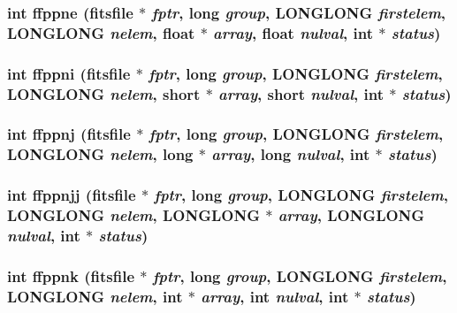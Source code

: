 \subsubsection{\setlength{\rightskip}{0pt plus 5cm}int ffppne (\bf{fitsfile} $\ast$ {\em fptr}, long {\em group}, \bf{LONGLONG} {\em firstelem}, \bf{LONGLONG} {\em nelem}, float $\ast$ {\em array}, float {\em nulval}, int $\ast$ {\em status})}\label{src_2fitsio_8h_01aa3f24254f8d3895463d830679fc52}


\subsubsection{\setlength{\rightskip}{0pt plus 5cm}int ffppni (\bf{fitsfile} $\ast$ {\em fptr}, long {\em group}, \bf{LONGLONG} {\em firstelem}, \bf{LONGLONG} {\em nelem}, short $\ast$ {\em array}, short {\em nulval}, int $\ast$ {\em status})}\label{src_2fitsio_8h_784592ce7e18c4280a1956b6f39cc70f}


\subsubsection{\setlength{\rightskip}{0pt plus 5cm}int ffppnj (\bf{fitsfile} $\ast$ {\em fptr}, long {\em group}, \bf{LONGLONG} {\em firstelem}, \bf{LONGLONG} {\em nelem}, long $\ast$ {\em array}, long {\em nulval}, int $\ast$ {\em status})}\label{src_2fitsio_8h_4a7b775c21b67c8744fbd23f9a3c1789}


\subsubsection{\setlength{\rightskip}{0pt plus 5cm}int ffppnjj (\bf{fitsfile} $\ast$ {\em fptr}, long {\em group}, \bf{LONGLONG} {\em firstelem}, \bf{LONGLONG} {\em nelem}, \bf{LONGLONG} $\ast$ {\em array}, \bf{LONGLONG} {\em nulval}, int $\ast$ {\em status})}\label{src_2fitsio_8h_76ad1e16557d84ed3f528848a243db06}


\subsubsection{\setlength{\rightskip}{0pt plus 5cm}int ffppnk (\bf{fitsfile} $\ast$ {\em fptr}, long {\em group}, \bf{LONGLONG} {\em firstelem}, \bf{LONGLONG} {\em nelem}, int $\ast$ {\em array}, int {\em nulval}, int $\ast$ {\em status})}\label{src_2fitsio_8h_eb3b195b63cb8a9b04d47cf6b8fda66a}


